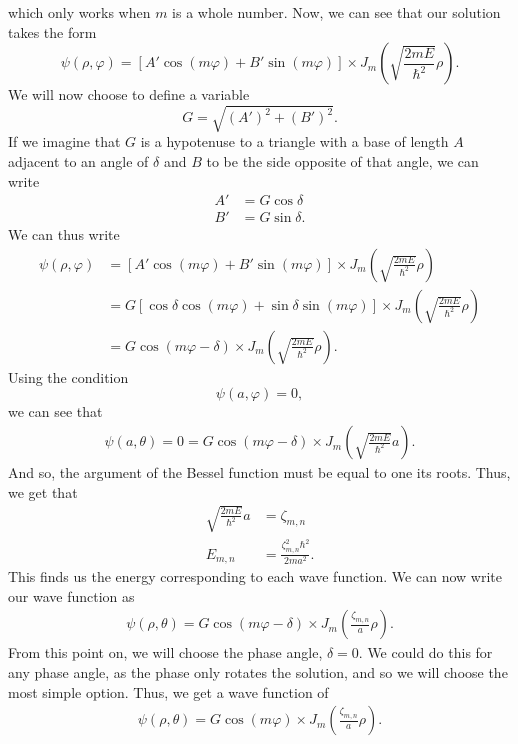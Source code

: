 \documentclass[11pt]{report}
\newcommand{\fpar}[1]{\left({#1}\right)}
\newcommand{\fbrac}[1]{\left[{#1}\right]}
\begin{document}
which only works when $m$ is a whole number. Now, we can see that our solution takes the form
    \begin{equation*}
        \psi\fpar{\rho,\varphi} = \fbrac{A'\cos\fpar{m\varphi}+B'\sin\fpar{m\varphi}}\times J_m\fpar{\sqrt{\frac{2mE}{\hbar^2}}\rho}.
    \end{equation*}
We will now choose to define a variable
    \[G=\sqrt{(A')^2+(B')^2}.\]
If we imagine that $G$ is a hypotenuse to a triangle with a base of length $A$ adjacent to an angle of $\delta$ and $B$ to be the side opposite of that angle, we can write
    \begin{align*}
        A' &= G\cos\delta\\
        B' &= G\sin\delta.
    \end{align*}
We can thus write
    \begin{align*}
        \psi\fpar{\rho,\varphi}  &= \fbrac{A'\cos\fpar{m\varphi}+B'\sin\fpar{m\varphi}}\times J_m\fpar{\sqrt{\frac{2mE}{\hbar^2}}\rho}\\
        &= G\fbrac{\cos\delta\cos\fpar{m\varphi}+\sin\delta\sin\fpar{m\varphi}}\times J_m\fpar{\sqrt{\frac{2mE}{\hbar^2}}\rho}\\
        &= G\cos\fpar{m\varphi-\delta}\times J_m\fpar{\sqrt{\frac{2mE}{\hbar^2}}\rho}.
    \end{align*}
Using the condition 
    \[\psi\fpar{a,\varphi}=0,\]
we can see that
    \begin{align*}
        \psi\fpar{a,\theta}= 0 =  G\cos\fpar{m\varphi-\delta}\times J_m\fpar{\sqrt{\frac{2mE}{\hbar^2}}a}.
    \end{align*}
And so, the argument of the Bessel function must be equal to one its roots. Thus, we get that
    \begin{align*}
        \sqrt{\frac{2mE}{\hbar^2}}a &= \zeta_{m,n}\\
        E_{m,n} &= \frac{\zeta_{m,n}^2\hbar^2}{2ma^2}.
    \end{align*}
This finds us the energy corresponding to each wave function. We can now write our wave function as
    \begin{align*}
        \psi\fpar{\rho,\theta} =  G\cos\fpar{m\varphi-\delta}\times J_m\fpar{\frac{\zeta_{m,n}}{a}\rho}.
    \end{align*}
From this point on, we will choose the phase angle, $\delta=0$. We could do this for any phase angle, as the phase only rotates the solution, and so we will choose the most simple option. Thus, we get a wave function of
    \begin{align*}
        \psi\fpar{\rho,\theta} =  G\cos\fpar{m\varphi
        }\times J_m\fpar{\frac{\zeta_{m,n}}{a}\rho}.
    \end{align*}
\end{document}
